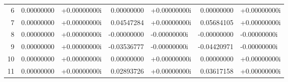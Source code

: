\begin{longtable}{r r@{\,}l r@{\,}l r@{\,}l}
6 & 0.00000000 & +0.00000000i & 0.00000000 & +0.00000000i & 0.00000000 & +0.00000000i\\
7 & 0.00000000 & +0.00000000i & 0.04547284 & +0.00000000i & 0.05684105 & +0.00000000i\\
8 & 0.00000000 & +0.00000000i & -0.00000000 & -0.00000000i & -0.00000000 & -0.00000000i\\
9 & 0.00000000 & +0.00000000i & -0.03536777 & -0.00000000i & -0.04420971 & -0.00000000i\\
10 & 0.00000000 & +0.00000000i & 0.00000000 & +0.00000000i & 0.00000000 & +0.00000000i\\
11 & 0.00000000 & +0.00000000i & 0.02893726 & +0.00000000i & 0.03617158 & +0.00000000i\\
\bottomrule
\end{longtable}
